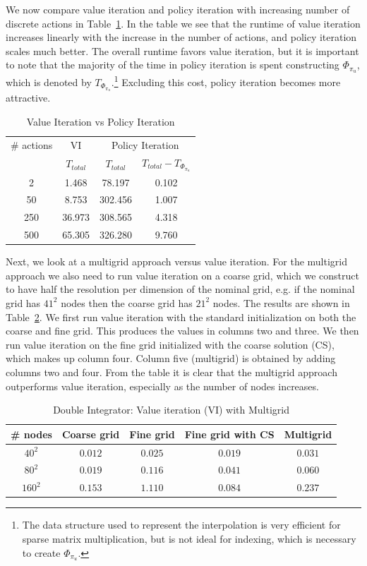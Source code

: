 We now compare value iteration and policy iteration with increasing number of discrete actions in Table~\ref{tab:v_vs_p}. In the table we see that the runtime of value iteration increases linearly with the increase in the number of actions, and policy iteration scales much better. The overall runtime favors value iteration, but it is important to note that the majority of the time in policy iteration is spent constructing $\Phi_{\pi_u}$, which is denoted by $T_{\Phi_{\pi_u}}$.\footnote{The data structure used to represent the interpolation is very efficient for sparse matrix multiplication, but is not ideal for indexing, which is necessary to create $\Phi_{\pi_u}$.} Excluding this cost, policy iteration becomes more attractive.

\begin{table}
\centering
\caption{Value Iteration vs Policy Iteration}
\label{tab:v_vs_p}
\begin{tabular}{|c| c| c| c|}
\hline
\# actions & VI & \multicolumn{2}{|c|}{Policy Iteration} \\ \cline{3-4}
 &  $T_{total} $ & $T_{total}$ & $T_{total} - T_{\Phi_{\pi_u}}$ \\ \hline
2 & 1.468  & 78.197  & 0.102 \\ \hline
50 &  8.753 &  302.456 & 1.007 \\ \hline
250 & 36.973 &  308.565 & 4.318 \\ \hline
500 & 65.305 &  326.280 & 9.760\\
\hline
\end{tabular}
\end{table}

Next, we look at a multigrid approach versus value iteration. For the multigrid approach we also need to run value iteration on a coarse grid, which we construct to have half the resolution per dimension of the nominal grid, e.g. if the nominal grid has $41^2$ nodes then the coarse grid has $21^2$ nodes. The results are shown in Table~\ref{tab:multigrid_di}. We first run value iteration with the standard initialization on both the coarse and fine grid. This produces the values in columns two and three. We then run value iteration on the fine grid initialized with the coarse solution (CS), which makes up column four. Column five (multigrid) is obtained by adding columns two and four. From the table it is clear that the multigrid approach outperforms value iteration, especially as the number of nodes increases.

\begin{table}
\centering
\caption{Double Integrator: Value iteration (VI) with Multigrid}
\label{tab:multigrid_di}
\begin{tabular}{|c| c| c| c| c| }
\hline
\# nodes & Coarse grid & Fine grid &  Fine grid with CS & Multigrid \\ \hline
$40^2$ & $0.012$ & $0.025$ & $0.019$ & $0.031$ \\ \hline
$80^2$ & $0.019$ & $0.116$ & $0.041$ & $0.060$\\ \hline
$160^2$ & $0.153$ & $1.110$ & $0.084$ & $0.237$\\ \hline
\end{tabular}
\end{table}

